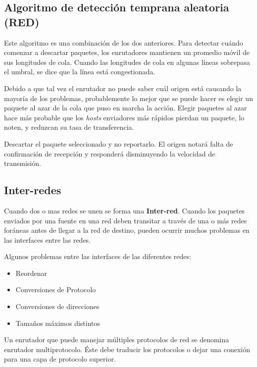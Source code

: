 	\subsection{Algoritmo de detección temprana aleatoria (RED)}
	
		\par Este algoritmo es una combinación de los dos anteriores. Para detectar cuándo comenzar a descartar paquetes, los enrutadores mantienen un promedio móvil de sus longitudes de cola. Cuando las longitudes de cola en algunas líneas sobrepasa el umbral, se dice que la línea está congestionada. 
		
		\par Debido a que tal vez el enrutador no puede saber cuál origen está causando la mayoría de los problemas, probablemente lo mejor que se puede hacer es elegir un paquete al azar de la cola que puso en marcha la acción. Elegir paquetes al azar hace más probable que los \textit{hosts} enviadores más rápidos pierdan un paquete, lo noten, y reduzcan su tasa de transferencia.

		\par Descartar el paquete seleccionado y no reportarlo. El origen notará falta de confirmación de recepción y responderá disminuyendo la velocidad de transmisión.

	 \subsection{Inter-redes}
	 Cuando dos o mas redes se unen se forma una \textbf{Inter-red}. Cuando los paquetes enviados por una fuente en una red deben transitar a través de una o más redes
foráneas antes de llegar a la red de destino, pueden ocurrir muchos problemas en las interfaces entre
las redes.

	\par Algunos problemas entre las interfaces de las diferentes redes:
	\begin{itemize}
		\item Reordenar
		\item Conversiones de Protocolo
		\item Conversiones de direcciones
		\item Tamaños máximos distintos
	\end{itemize}
	Un enrutador que puede manejar múltiples protocolos de red se denomina enrutador multiprotocolo. Éste debe traducir los protocolos o dejar una conexión para una capa de protocolo superior.
